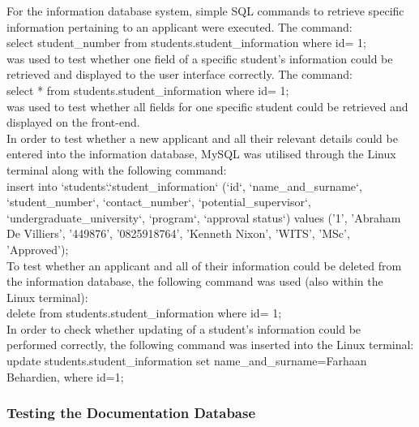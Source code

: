 \documentclass[journal]{IEEEtran}
\begin{document}
\hfill \break For the information database system, simple SQL commands to retrieve specific information pertaining to an applicant were executed. The command: \\

select student\_number from students.student\_information where id= 1; \\

was used to test whether one field of a specific student's information could be retrieved and displayed to the user interface correctly. The command: \\

select * from students.student\_information where id= 1; \\

was used to test whether all fields for one specific student could be retrieved and displayed on the front-end. \\

In order to test whether a new applicant and all their relevant details could be entered into the information database, MySQL was utilised through the Linux terminal along with the following command: \\

insert into `students`.`student\_information` (`id`, `name\_and\_surname`, `student\_number`, `contact\_number`, `potential\_supervisor`, `undergraduate\_university`, `program`, `approval status`) values ('1', 'Abraham De Villiers', '449876', '0825918764', 'Kenneth Nixon', 'WITS', 'MSc', 'Approved'); \\

To test whether an applicant and all of their information could be deleted from the information database, the following command was used (also within the Linux terminal): \\

delete from students.student\_information where id= 1; \\

In order to check whether updating of a student's information could be performed correctly, the following command was inserted into the Linux terminal: \\

update students.student\_information set name\_and\_surname=Farhaan Behardien, where id=1; \\

\subsubsection{Testing the Documentation Database}
\end{document}
